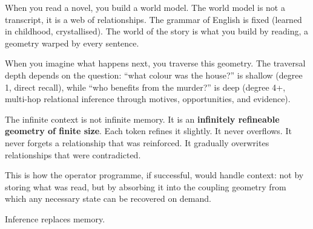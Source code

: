 \documentclass[11pt, a4paper]{article}
\theoremstyle{plain}
\theoremstyle{definition}
\theoremstyle{remark}
\begin{document}
When you read a novel, you build a world model.
The world model is not a transcript, it is a web of relationships.
The grammar of English is fixed (learned in childhood, crystallised).
The world of the story is what you build by reading, a geometry warped by every sentence.

When you imagine what happens next, you traverse this geometry.
The traversal depth depends on the question: ``what colour was the house?'' is shallow (degree 1, direct recall), while ``who benefits from the murder?'' is deep (degree 4+, multi-hop relational inference through motives, opportunities, and evidence).

The infinite context is not infinite memory.
It is an \textbf{infinitely refineable geometry of finite size}.
Each token refines it slightly.
It never overflows.
It never forgets a relationship that was reinforced.
It gradually overwrites relationships that were contradicted.

This is how the operator programme, if successful, would handle context: not by storing what was read, but by absorbing it into the coupling geometry from which any necessary state can be recovered on demand.

Inference replaces memory.
\end{document}
